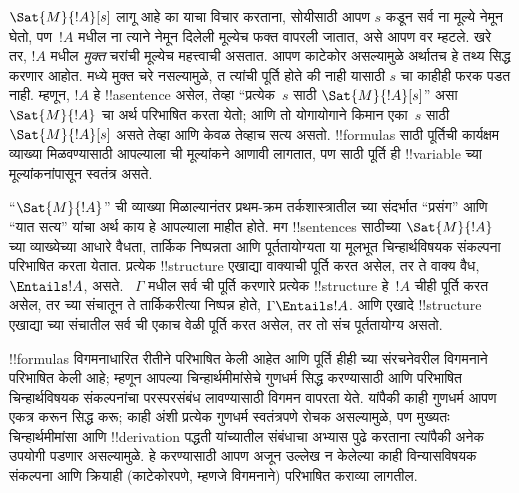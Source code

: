 \documentclass[../../../include/open-logic-section]{subfiles}
\begin{document}


$\Sat{M}{!A}[s]$ लागू आहे का याचा विचार करताना, सोयीसाठी आपण $s$ कडून
सर्व ना मूल्ये नेमून घेतो, पण~$!A$ मधील ना
त्याने नेमून दिलेली मूल्येच फक्त वापरली जातात, असे आपण वर म्हटले.
खरे तर, $!A$ मधील \emph{मुक्त} चरांची मूल्येच महत्त्वाची असतात. आपण
काटेकोर असल्यामुळे अर्थातच हे तथ्य सिद्ध करणार आहोत. मध्ये
मुक्त चरे नसल्यामुळे, त त्यांची पूर्ति होते की नाही
यासाठी $s$ चा काहीही फरक पडत नाही. म्हणून, $!A$ हे !!a{sentence} असेल,
तेव्हा ``प्रत्येक~$s$ साठी $\Sat{M}{!A}[s]$'' असा $\Sat{M}{!A}$ चा अर्थ
परिभाषित करता येतो; आणि तो योगायोगाने किमान एका~$s$ साठी
$\Sat{M}{!A}[s]$ असते तेव्हा आणि केवळ तेव्हाच सत्य असतो. !!{formula}s
साठी पूर्तिची कार्यक्षम व्याख्या मिळवण्यासाठी आपल्याला ची
मूल्यांकने आणावी लागतात, पण साठी पूर्ति ही !!{variable}
च्या मूल्यांकनांपासून स्वतंत्र असते.

``$\Sat{M}{!A}$'' ची व्याख्या मिळाल्यानंतर प्रथम-क्रम तर्कशास्त्रातील
च्या संदर्भात ``प्रसंग'' आणि ``यात सत्य'' यांचा अर्थ काय
हे आपल्याला माहीत होते. मग !!{sentence}s साठीच्या $\Sat{M}{!A}$ च्या
व्याख्येच्या आधारे वैधता, तार्किक निष्पन्नता आणि पूर्ततायोग्यता या मूलभूत
चिन्हार्थविषयक संकल्पना परिभाषित करता येतात. प्रत्येक !!{structure}
एखाद्या वाक्याची पूर्ति करत असेल, तर ते वाक्य वैध, $\Entails !A$, असते.
~$\Gamma$ मधील सर्व ची पूर्ति करणारे प्रत्येक
!!{structure} हे~$!A$ चीही पूर्ति करत असेल, तर च्या संचातून
ते तार्किकरीत्या निष्पन्न होते, $\Gamma \Entails !A$. आणि एखादे
!!{structure} एखाद्या च्या संचातील सर्व ची एकाच
वेळी पूर्ति करत असेल, तर तो संच पूर्ततायोग्य असतो.

!!{formula}s विगमनाधारित रीतीने परिभाषित केली आहेत आणि पूर्ति हीही
च्या संरचनेवरील विगमनाने परिभाषित केली आहे; म्हणून आपल्या
चिन्हार्थमीमांसेचे गुणधर्म सिद्ध करण्यासाठी आणि परिभाषित
चिन्हार्थविषयक संकल्पनांचा परस्परसंबंध लावण्यासाठी विगमन वापरता येते.
यांपैकी काही गुणधर्म आपण एकत्र करून सिद्ध करू; काही अंशी प्रत्येक
गुणधर्म स्वतंत्रपणे रोचक असल्यामुळे, पण मुख्यतः चिन्हार्थमीमांसा आणि
!!{derivation} पद्धती यांच्यातील संबंधाचा अभ्यास पुढे करताना त्यांपैकी
अनेक उपयोगी पडणार असल्यामुळे. हे करण्यासाठी आपण अजून उल्लेख न केलेल्या
काही विन्यासविषयक संकल्पना आणि क्रियाही (काटेकोरपणे, म्हणजे विगमनाने)
परिभाषित कराव्या लागतील.
\end{document}
